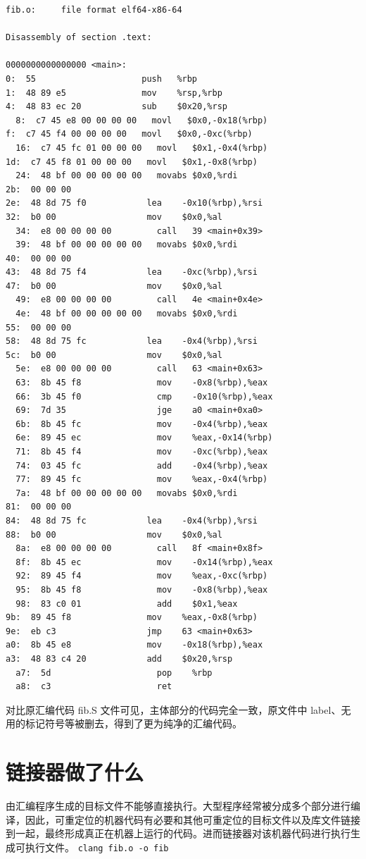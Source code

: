 \documentclass[UTF8,a4paper,10pt]{ctexart}
\begin{document}
\begin{verbatim}
fib.o:     file format elf64-x86-64

Disassembly of section .text:

0000000000000000 <main>:
0:  55                     push   %rbp
1:  48 89 e5               mov    %rsp,%rbp
4:  48 83 ec 20            sub    $0x20,%rsp
  8:  c7 45 e8 00 00 00 00   movl   $0x0,-0x18(%rbp)
f:  c7 45 f4 00 00 00 00   movl   $0x0,-0xc(%rbp)
  16:  c7 45 fc 01 00 00 00   movl   $0x1,-0x4(%rbp)
1d:  c7 45 f8 01 00 00 00   movl   $0x1,-0x8(%rbp)
  24:  48 bf 00 00 00 00 00   movabs $0x0,%rdi
2b:  00 00 00
2e:  48 8d 75 f0            lea    -0x10(%rbp),%rsi
32:  b0 00                  mov    $0x0,%al
  34:  e8 00 00 00 00         call   39 <main+0x39>
  39:  48 bf 00 00 00 00 00   movabs $0x0,%rdi
40:  00 00 00
43:  48 8d 75 f4            lea    -0xc(%rbp),%rsi
47:  b0 00                  mov    $0x0,%al
  49:  e8 00 00 00 00         call   4e <main+0x4e>
  4e:  48 bf 00 00 00 00 00   movabs $0x0,%rdi
55:  00 00 00
58:  48 8d 75 fc            lea    -0x4(%rbp),%rsi
5c:  b0 00                  mov    $0x0,%al
  5e:  e8 00 00 00 00         call   63 <main+0x63>
  63:  8b 45 f8               mov    -0x8(%rbp),%eax
  66:  3b 45 f0               cmp    -0x10(%rbp),%eax
  69:  7d 35                  jge    a0 <main+0xa0>
  6b:  8b 45 fc               mov    -0x4(%rbp),%eax
  6e:  89 45 ec               mov    %eax,-0x14(%rbp)
  71:  8b 45 f4               mov    -0xc(%rbp),%eax
  74:  03 45 fc               add    -0x4(%rbp),%eax
  77:  89 45 fc               mov    %eax,-0x4(%rbp)
  7a:  48 bf 00 00 00 00 00   movabs $0x0,%rdi
81:  00 00 00
84:  48 8d 75 fc            lea    -0x4(%rbp),%rsi
88:  b0 00                  mov    $0x0,%al
  8a:  e8 00 00 00 00         call   8f <main+0x8f>
  8f:  8b 45 ec               mov    -0x14(%rbp),%eax
  92:  89 45 f4               mov    %eax,-0xc(%rbp)
  95:  8b 45 f8               mov    -0x8(%rbp),%eax
  98:  83 c0 01               add    $0x1,%eax
9b:  89 45 f8               mov    %eax,-0x8(%rbp)
9e:  eb c3                  jmp    63 <main+0x63>
a0:  8b 45 e8               mov    -0x18(%rbp),%eax
a3:  48 83 c4 20            add    $0x20,%rsp
  a7:  5d                     pop    %rbp
  a8:  c3                     ret
  \end{verbatim}

对比原汇编代码 fib.S 文件可见，主体部分的代码完全一致，原文件中 label、无用的标记符号等被删去，得到了更为纯净的汇编代码。

\section{链接器做了什么}
由汇编程序生成的目标文件不能够直接执行。大型程序经常被分成多个部分进行编译，因此，可重定位的机器代码有必要和其他可重定位的目标文件以及库文件链接到一起，最终形成真正在机器上运行的代码。进而链接器对该机器代码进行执行生成可执行文件。
\verb|clang fib.o -o fib|
\end{document}

